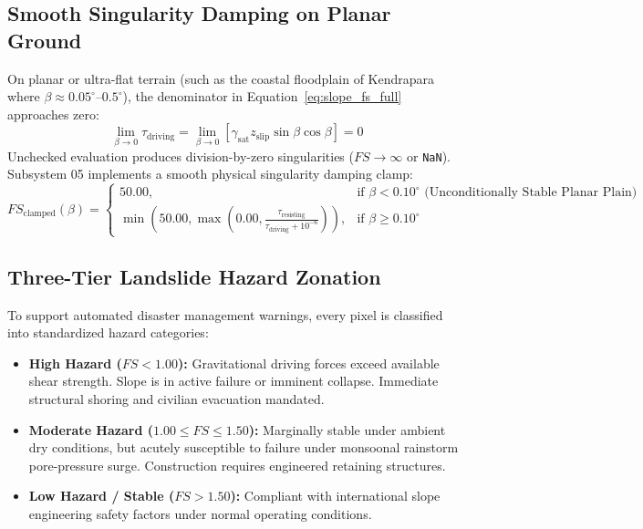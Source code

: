 \documentclass[11pt,a4paper]{article}
\theoremstyle{definition}
\theoremstyle{remark}
\begin{document}
\subsection{Smooth Singularity Damping on Planar Ground}
On planar or ultra-flat terrain (such as the coastal floodplain of Kendrapara where $\beta \approx 0.05^\circ\text{--}0.5^\circ$), the denominator in Equation~\eqref{eq:slope_fs_full} approaches zero:
\begin{equation}
    \lim_{\beta \to 0} \tau_{\text{driving}} = \lim_{\beta \to 0} \left[ \gamma_{\text{sat}} z_{\text{slip}} \sin \beta \cos \beta \right] = 0
\end{equation}
Unchecked evaluation produces division-by-zero singularities ($FS \to \infty$ or \texttt{NaN}). Subsystem 05 implements a smooth physical singularity damping clamp:
\begin{equation}
    FS_{\text{clamped}}(\beta) = \begin{cases}
        50.00, & \text{if } \beta < 0.10^\circ \text{ (Unconditionally Stable Planar Plain)} \\
        \min\left( 50.00, \max\left( 0.00, \frac{\tau_{\text{resisting}}}{\tau_{\text{driving}} + 10^{-6}} \right) \right), & \text{if } \beta \ge 0.10^\circ
    \end{cases}
\end{equation}

\subsection{Three-Tier Landslide Hazard Zonation}
To support automated disaster management warnings, every pixel is classified into standardized hazard categories:
\begin{itemize}
    \item \textbf{High Hazard ($FS < 1.00$):} Gravitational driving forces exceed available shear strength. Slope is in active failure or imminent collapse. Immediate structural shoring and civilian evacuation mandated.
    \item \textbf{Moderate Hazard ($1.00 \le FS \le 1.50$):} Marginally stable under ambient dry conditions, but acutely susceptible to failure under monsoonal rainstorm pore-pressure surge. Construction requires engineered retaining structures.
    \item \textbf{Low Hazard / Stable ($FS > 1.50$):} Compliant with international slope engineering safety factors under normal operating conditions.
\end{itemize}
\end{document}
